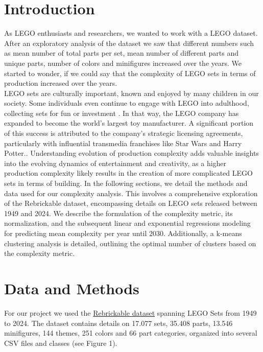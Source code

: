 \documentclass{article}
\theoremstyle{plain}
\theoremstyle{definition}
\theoremstyle{remark}
\begin{document}
\section{Introduction}\label{sec:intro}
As LEGO enthusiasts and researchers, we wanted to work with a LEGO dataset. After an exploratory analysis of the dataset we saw that different numbers such as mean number of total parts per set, mean number of different parts and unique parts, number of colors and minifigures increased over the years. We started to wonder, if we could say that the complexity of LEGO sets in terms of production increased over the years. \\
LEGO sets are culturally important, known and enjoyed by many children in our society. Some individuals even continue to engage with LEGO into adulthood, collecting sets for fun or investment \cite{dobrynskaya2018LEGO}. In that way, the LEGO company has expanded to become the world's largest toy manufacturer. A significant portion of this success is attributed to the company's strategic licensing agreements, particularly with influential transmedia franchises like Star Wars and Harry Potter.\cite{mazzarella2019let}. Understanding evolution of production complexity adds valuable insights into the evolving dynamics of entertainment and creativity, as a higher production complexity likely results in the creation of more complicated LEGO sets in terms of building.
In the following sections, we detail the methods and data used for our complexity analysis. This involves a comprehensive exploration of the Rebrickable dataset, encompassing details on LEGO sets released between 1949 and 2024. We describe the formulation of the complexity metric, its normalization, and the subsequent linear and exponential regressions modeling for predicting mean complexity per year until 2030. Additionally, a k-means clustering analysis is detailed, outlining the optimal number of clusters based on the complexity metric.


\section{Data and Methods}\label{sec:methods}

For our project we used the \href{https://rebrickable.com/downloads/}{Rebrickable dataset} spanning LEGO Sets from 1949 to 2024. The dataset contains details on 17.077 sets, 35.408 parts, 13.546 minifigures, 144 themes, 251 colors and 66 part categories, organized into several CSV files and classes (see Figure 1).
\end{document}
